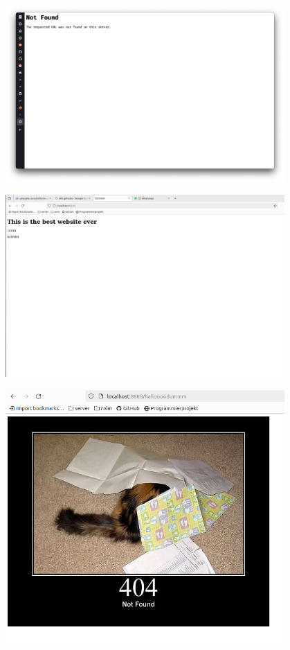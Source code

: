 \documentclass[aspectratio=169]{beamer}
\begin{document}
\begin{frame}[c]{}
  \centering
\includegraphics[width=0.8\textwidth,height=\textheight,keepaspectratio]{00_errors1.png}
\end{frame}

\begin{frame}[c]{}
  \centering
\includegraphics[width=0.8\textwidth,height=\textheight,keepaspectratio]{01_bare_html.png}
\end{frame}

\begin{frame}[c]{}
  \centering
\includegraphics[width=0.8\textwidth,height=\textheight,keepaspectratio]{02_http_cats.png}
\end{frame}
\end{document}
